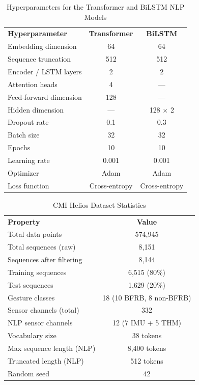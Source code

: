 \documentclass[conference]{IEEEtran}
\begin{document}
\begin{table}[!ht]
\centering
\small
\caption{Hyperparameters for the Transformer and BiLSTM NLP Models}
\label{tab:hyperparams}
\begin{tabular}{lcc}

\textbf{Hyperparameter} & \textbf{Transformer} & \textbf{BiLSTM} \\

Embedding dimension     & 64        & 64        \\
Sequence truncation     & 512       & 512       \\
Encoder / LSTM layers   & 2         & 2         \\
Attention heads         & 4         & ---       \\
Feed-forward dimension  & 128       & ---       \\
Hidden dimension        & ---       & 128 $\times$ 2 \\
Dropout rate            & 0.1       & 0.3       \\
Batch size              & 32        & 32        \\
Epochs                  & 10        & 10        \\
Learning rate           & 0.001     & 0.001     \\
Optimizer               & Adam      & Adam      \\
Loss function           & Cross-entropy & Cross-entropy \\
\end{tabular}
\end{table}

\begin{table}[!ht]
\centering
\small
\caption{CMI Helios Dataset Statistics}
\label{tab:dataset}
\begin{tabular}{lc}
\textbf{Property}                  & \textbf{Value}     \\
Total data points                  & 574,945            \\
Total sequences (raw)              & 8,151              \\
Sequences after filtering          & 8,144              \\
Training sequences                 & 6,515 (80\%)       \\
Test sequences                     & 1,629 (20\%)       \\
Gesture classes                    & 18 (10 BFRB, 8 non-BFRB) \\
Sensor channels (total)            & 332                \\
NLP sensor channels                & 12 (7 IMU + 5 THM) \\
Vocabulary size                    & 38 tokens          \\
Max sequence length (NLP)          & 8,400 tokens       \\
Truncated length (NLP)             & 512 tokens         \\
Random seed                        & 42                 \\
\end{tabular}
\end{table}
\end{document}
